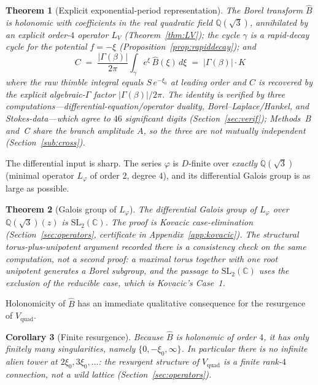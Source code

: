 \documentclass[11pt,reqno]{amsart}
\renewcommand{\_}{\vquadorigunderscore\allowbreak}
\theoremstyle{plain}
\newtheorem{theorem}{Theorem}[section]
\newtheorem{corollary}[theorem]{Corollary}
\theoremstyle{definition}
\newcommand{\Vquad}{V_{\mathrm{quad}}}
\newcommand{\Bhat}{\widehat{B}}
\newcommand{\Lphi}{L_{\varphi}}
\newcommand{\LV}{L_{V}}
\newcommand{\Qsqrt}{\mathbb{Q}(\sqrt3)}
\newcommand{\xizero}{\xi_0}
\newcommand{\SL}{\mathrm{SL}}
\providecommand{\C}{}\renewcommand{\C}{C}
\begin{document}
\begin{theorem}[Explicit exponential-period representation]\label{thm:main}
The Borel transform $\Bhat$ is holonomic with coefficients in the real quadratic field
$\Qsqrt$, annihilated by an explicit order-$4$ operator $\LV$ (Theorem~\ref{thm:LV}); the
cycle $\gamma$ is a rapid-decay cycle for the potential $f=-\xi$
(Proposition~\ref{prop:rapiddecay}); and
\begin{equation}\label{eq:main-identity}
  \boxed{\;\C\;=\;\frac{\lvert\Gamma(\beta)\rvert}{2\pi}\int_{\gamma} e^{\xi}\,\Bhat(\xi)\,d\xi
  \;=\;\lvert\Gamma(\beta)\rvert\cdot K\;}
\end{equation}
where the raw thimble integral equals $S\,e^{-\xizero}$ at leading order and $\C$ is recovered
by the explicit algebraic-$\Gamma$ factor $\lvert\Gamma(\beta)\rvert/2\pi$. The identity is
verified by three computations---differential-equation/operator duality,
Borel--Laplace/Hankel, and Stokes-data---which agree to $46$ significant digits
(Section~\ref{sec:verif}); Methods~B and~C share the branch amplitude $A$, so the three are not
mutually independent (Section~\ref{sub:cross}).
\end{theorem}

The differential input is sharp. The series $\varphi$ is $D$-finite over \emph{exactly} $\Qsqrt$
(minimal operator $\Lphi$ of order $2$, degree $4$), and its differential Galois group is as
large as possible.

\begin{theorem}[Galois group of $\Lphi$]\label{thm:galois}
The differential Galois group of $\Lphi$ over $\Qsqrt(z)$ is $\SL_2(\mathbb{C})$. The proof is
Kovacic case-elimination (Section~\ref{sec:operators}, certificate in
Appendix~\ref{app:kovacic}). The structural torus-plus-unipotent argument recorded there is a
consistency check on the same computation, not a second proof: a maximal torus together with
one root unipotent generates a \emph{Borel} subgroup, and the passage to $\SL_2(\mathbb{C})$
uses the exclusion of the reducible case, which is Kovacic's Case~1.
\end{theorem}

Holonomicity of $\Bhat$ has an immediate qualitative consequence for the resurgence of $\Vquad$.

\begin{corollary}[Finite resurgence]\label{cor:finite}
Because $\Bhat$ is holonomic of order $4$, it has only finitely many singularities, namely
$\{0,-\xizero,\infty\}$. In particular there is \emph{no} infinite alien tower at
$2\xizero,3\xizero,\dots$: the resurgent structure of $\Vquad$ is a finite rank-$4$ connection,
not a wild lattice (Section~\ref{sec:operators}).
\end{corollary}
\end{document}

